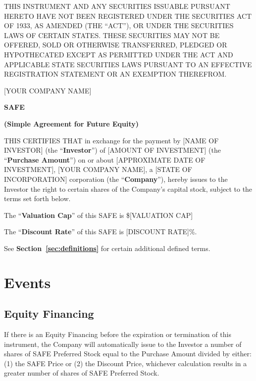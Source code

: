 \documentclass[12pt,letterpaper,fullpage]{article}
\newcommand{\Company}{[YOUR COMPANY NAME]}
\newcommand{\IncorporationState}{[STATE OF INCORPORATION]}
\newcommand{\InvestorName}{[NAME OF INVESTOR]}
\newcommand{\InvestmentAmount}{[AMOUNT OF INVESTMENT]}
\newcommand{\InvestmentDate}{[APPROXIMATE DATE OF INVESTMENT]}
\newcommand{\ValuationCap}{\$[VALUATION CAP]}
\newcommand{\DiscountRate}{[DISCOUNT RATE]\%}
\begin{document}
\begin{sloppypar}
THIS INSTRUMENT AND ANY SECURITIES ISSUABLE PURSUANT HERETO HAVE NOT
BEEN REGISTERED UNDER THE SECURITIES ACT OF 1933, AS AMENDED (THE
“ACT”), OR UNDER THE SECURITIES LAWS OF CERTAIN STATES. THESE
SECURITIES MAY NOT BE OFFERED, SOLD OR OTHERWISE TRANSFERRED, PLEDGED
OR HYPOTHECATED EXCEPT AS PERMITTED UNDER THE ACT AND APPLICABLE STATE
SECURITIES LAWS PURSUANT TO AN EFFECTIVE REGISTRATION STATEMENT OR AN
EXEMPTION THEREFROM.
\end{sloppypar}

\begin{center}
\Company{}


\textbf{SAFE}

\textbf{(Simple Agreement for Future Equity)}

\end{center}

\begin{sloppypar}
THIS CERTIFIES THAT in exchange for the payment by \InvestorName{}
(the “\textbf{Investor}”) of \InvestmentAmount{} (the
“\textbf{Purchase Amount}”) on or about \InvestmentDate{}, \Company{},
a \IncorporationState{} corporation (the “\textbf{Company}”), hereby
issues to the Investor the right to certain shares of the Company’s
capital stock, subject to the terms set forth below.
\end{sloppypar}

The “\textbf{Valuation Cap}” of this SAFE is \ValuationCap{}

The “\textbf{Discount Rate}” of this SAFE is \DiscountRate{}.

See \textbf{Section~\ref{sec:definitions}} for certain additional defined terms.

\section{Events}
\label{sec:events}

\subsection{Equity Financing}
\label{sec:equityfinancing}


If there is an Equity Financing before the expiration or termination
of this instrument, the Company will automatically issue to the
Investor a number of shares of SAFE Preferred Stock equal to the
Purchase Amount divided by either: (1) the SAFE Price or (2) the
Discount Price, whichever calculation results in a greater number of
shares of SAFE Preferred Stock.
\end{document}

